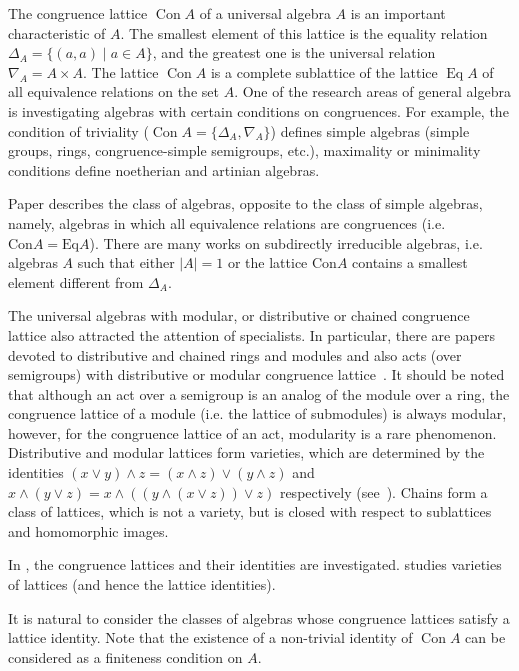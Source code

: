 \documentclass{birkau}
\numberwithin{equation}{section}
\theoremstyle{plain}
\theoremstyle{definition}
\DeclareMathOperator{\Con}{Con}
\DeclareMathOperator{\Eq}{Eq}
\begin{document}
	The congruence lattice $\Con A$ of a universal algebra $ A $ is an important characteristic of $A$. The smallest element of this lattice is the equality relation $ \Delta_A = \{ (a,a) \mid a \in A \} $, and the greatest one is the universal relation $ \nabla_A = A \times A $. The lattice $\Con A$ is a complete sublattice of the lattice $\Eq A$ of all equivalence relations on the set $A$.
    One of the research areas of general algebra is investigating algebras with certain conditions on congruences.	For example, the condition of triviality ($ \Con A = \{ \Delta_A, \nabla_A \} $) defines simple algebras (simple groups, rings, congruence-simple semigroups, etc.), maximality or minimality conditions define noetherian and artinian algebras.
	
	Paper \cite{resh} describes the class of algebras, opposite to the class of simple algebras, namely, algebras in which all equivalence relations are congruences (i.e. $ \text{Con}A = \text{Eq}A $).
    There are many works on subdirectly irreducible algebras, i.e. algebras $A$ such that either $ |A| = 1 $ or the lattice Con$A$ contains a smallest element different from $ \Delta_A $.
	
	The universal algebras with modular, or distributive or chained congruence lattice also attracted the attention of specialists. In particular, there are papers devoted to distributive and chained rings and modules and also acts (over semigroups) with distributive or modular congruence lattice~\cite{step,hal3}. It should be noted that although an act over a semigroup is an analog of the module over a ring, the congruence lattice of a module (i.e. the lattice of submodules) is always modular, however, for the congruence lattice of an act, modularity is a rare phenomenon. Distributive and modular lattices form varieties, which are determined by the identities $ (x \vee y) \wedge z = (x \wedge z ) \vee (y \wedge z) $ and $ x \wedge ( y \vee z ) = x \wedge (( y \wedge (x \vee z)) \vee z ) $ respectively (see~\cite[Chapter 4, Theorem 1.1]{gretz}).  Chains form a class of lattices, which is not a variety, but is closed with respect to sublattices and homomorphic images.
	
    In \cite{memoirs}, the congruence lattices and their identities are investigated. \cite{jipsen} studies varieties of lattices (and hence the lattice identities).

    It is natural to consider the classes of algebras whose congruence lattices satisfy a lattice identity.
    Note that the existence of a non-trivial identity of $\Con A$ can be considered as a finiteness condition on $A$.
\end{document}

